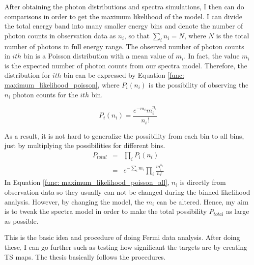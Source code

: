 \documentclass[12pt]{report}
\begin{document}
      After obtaining the photon distributions and spectra simulations, I then can do 
      comparisons in order to get the maximum likelihood of the model. I can divide the 
      total energy band into many smaller energy bins and denote
      the number of photon counts in observation data as $n_{i}$, so that 
      $\sum_{i}^{}n_{i} = N$, where $N$ is the total number of photons in full energy range. 
      The observed number of photon counts in $ith$ bin is a Poisson distribution with a 
      mean value of $m_{i}$. In fact, the value $m_{i}$ is the expected number of photon counts 
      from our spectra model. Therefore, the distribution for $ith$
      bin can be expressed by Equation \ref{func: maximum_likelihood_poisson}, where 
      $P_{i}\left(n_{i}\right)$ is the possibility of observing the $n_{i}$ photon counts 
      for the $ith$ bin. 

      \begin{equation}
        P_{i}\left(n_{i}\right) = \frac{e^{-m_{i}} m_{i}^{n_{i}}}{n_{i}!}
        \label{func: maximum_likelihood_poisson}
      \end{equation}

      As a result, it is not hard to generalize the possibility from each bin to all bins, 
      just by multiplying the possibilities for different bins.
      \begin{eqnarray}
        P_{total} &=& \prod_{i}^{}P_{i}\left(n_{i}\right) \nonumber \\ 
                  &=& e^{-\sum_{i}^{}m_i}\prod_{i}^{}\frac{m_{i}^{n_i}}{n_i!}
        \label{func: maximum_likelihood_poisson_all}
      \end{eqnarray}
      In Equation \ref{func: maximum_likelihood_poisson_all}, $n_i$ is directly 
      from observation data so they usually can not be changed during the binned likelihood 
      analysis. However, by changing the model, the $m_i$ can be altered. 
      Hence, my aim is to tweak the spectra model in order to make the total possibility 
      $P_{total}$ as large as possible. 

      This is the basic idea and procedure of doing Fermi data analysis. After doing these,
      I can go further such as testing how significant the targets are by creating TS 
      maps. The thesis basically follows the procedures. 
\end{document}
